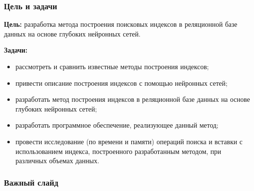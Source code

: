 \documentclass[8pt]{bmstu-pr}
\begin{document}

\begin{frame}
    \frametitle{Цель и задачи}

    {
    \fontsize{22pt}{22pt}\selectfont
    \textbf{Цель:} разработка метода построения поисковых индексов в реляционной
    базе данных на основе глубоких нейронных сетей.

    \vspace{2mm}
    \textbf{Задачи:}
    \begin{itemize}
        \item рассмотреть и сравнить известные методы построения индексов;
        \item привести описание построения индексов с помощью нейронных сетей;
        \item разработать метод построения индексов в реляционной базе
            данных на основе глубоких нейронных сетей;
        \item разработать программное обеспечение, реализующее данный метод;
        \item провести исследование (по времени и памяти) операций поиска и вставки
            с использованием индекса, построенного разработанным методом, при
            различных объемах данных.
    \end{itemize}
    }
\end{frame}

\begin{frame}
    \frametitle{Важный слайд}

\end{frame}
\end{document}
